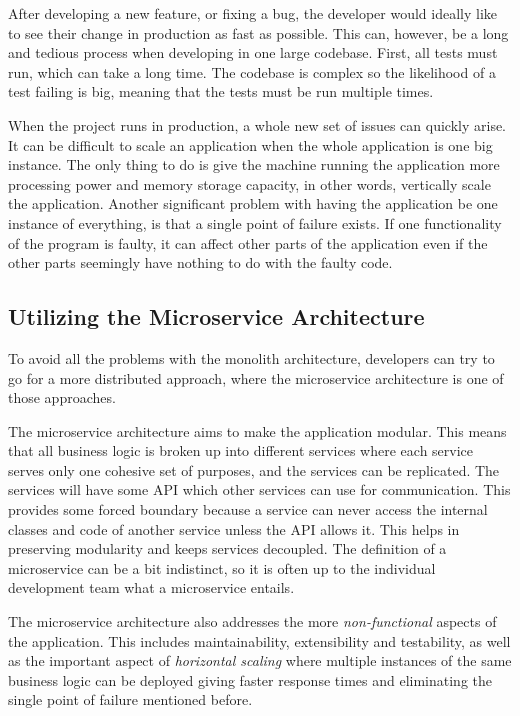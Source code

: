 After developing a new feature, or fixing a bug, the developer would ideally like to see their change
in production as fast as possible. This can, however, be a long and tedious process when developing in one large codebase.
First, all tests must run, which can take a long time. The codebase is complex so the likelihood of a
test failing is big, meaning that the tests must be run multiple times.

When the project runs in production, a whole new set of issues can quickly arise. It can be difficult
to scale an application when the whole application is one big instance.
The only thing to do is give the machine running the application more processing power and memory
storage capacity, in other words, vertically scale the application. Another significant problem with having the application be one instance of everything, is that a single point of failure exists. If one functionality of the program is faulty, it can affect other parts of the application
even if the other parts seemingly have nothing to do with the faulty code.

\subsection{Utilizing the Microservice Architecture}
To avoid all the problems with the monolith architecture, developers can try to go for a more
 distributed approach, where the microservice architecture is one of those approaches.

The microservice architecture aims to make the application modular. This means that all business logic is broken up into different services 
where each service serves only one cohesive set of purposes, and the services can be replicated.
The services will have some API which other services can use for communication. This provides some forced boundary because a service can never access the internal classes and code of another service unless the API allows it.
This helps in preserving modularity and keeps services decoupled.
The definition of a microservice can be a bit indistinct, so it is often up to the individual development team what a microservice entails.

The microservice architecture also addresses the more \textit{non-functional} aspects of the application.
This includes maintainability, extensibility and testability, as well as the important aspect of
\textit{horizontal scaling} where multiple instances of the same business logic can be deployed giving 
faster response times and eliminating the single point of failure mentioned before.


